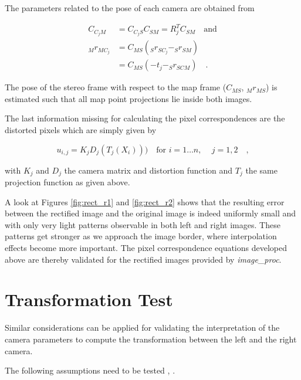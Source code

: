 The parameters related to the pose of each camera are obtained from

\begin{align}
  C_{C_jM} &= C_{C_jS} C_{SM} = R_j^TC_{SM} \hspace{1em} \text{and} \\
  _{M}r_{MC_j} &= C_{MS}(_{S}r_{SC_j} - _{S}r_{SM}) \\
  &= C_{MS}(-t_j - _{S}r_{SCM})\hspace{1em} \text{.}
\end{align}

The pose of the stereo frame with respect to the map frame ($C_{MS}$, $_{M}r_{MS}$) is estimated such that all map
point projections lie inside both images.

The last information missing for calculating the pixel correspondences are 
the distorted pixels which are simply given by 

\begin{equation}
  u_{i,j} = K_j D_j(T_j(X_i))) 
  \hspace{1em} \text{for } i = 1 \ldots n \text{, } \hspace{1em} j = 1,2
  \hspace{1em}\text{,}
  \label{eqn/rect/u_def}
\end{equation}

with $K_j$ and $D_j$ the camera matrix and distortion function and $T_j$ the same
projection function as given above. 

A look at Figures \ref{fig:rect_r1} and \ref{fig:rect_r2} shows that the resulting error
between the rectified image and the original image is indeed uniformly 
small and with only very light patterns observable in both left and right images.
These patterns get stronger as we approach the image border, where interpolation
effects become more important.
The pixel correspondence equations developed above are thereby validated for the 
rectified images provided by \textit{image\_proc}.

\newpage
\section{Transformation Test}

Similar considerations can be applied for validating the interpretation of the
camera parameters to compute the transformation between the left and the right
camera.

The following assumptions need to be tested \cite{DocCameraInfo},
\cite[p. 523f]{Siciliano2007}.

